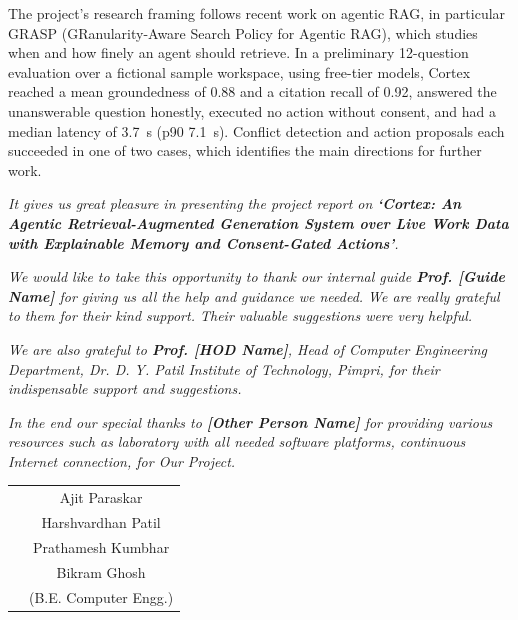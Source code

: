 \documentclass[oneside,a4paper,12pt]{report}
\newcommand{\ProjectTitle}{Cortex: An Agentic Retrieval-Augmented Generation System over Live Work Data with Explainable Memory and Consent-Gated Actions}
\begin{document}
\vspace*{0.5\baselineskip}
The project's research framing follows recent work on agentic RAG, in particular GRASP (GRanularity-Aware Search Policy for Agentic RAG), which studies when and how finely an agent should retrieve. In a preliminary 12-question evaluation over a fictional sample workspace, using free-tier models, Cortex reached a mean groundedness of 0.88 and a citation recall of 0.92, answered the unanswerable question honestly, executed no action without consent, and had a median latency of 3.7~s (p90 7.1~s). Conflict detection and action proposals each succeeded in one of two cases, which identifies the main directions for further work.


{   \setlength{\parindent}{11mm} }
{ \setlength{\parindent}{0mm} }
\textit{It gives us great pleasure in presenting the project report
on {\bfseries \fontsize{12}{12} \selectfont `\ProjectTitle'}.}
\vspace*{1.5\baselineskip}

 \textit{We would like to take this opportunity to thank our internal guide
 \textbf{Prof. [Guide Name]} for giving us all the help and guidance we needed. We are
 really grateful to them for their kind support. Their valuable suggestions were very helpful.} \vspace*{1.5\baselineskip}

 \textit{We are also grateful to \textbf{Prof. [HOD Name]}, Head of Computer
 Engineering Department, Dr. D. Y. Patil Institute of Technology, Pimpri, for their indispensable
 support and suggestions.}
\vspace*{1.5\baselineskip}

\textit{In the end our special thanks to \textbf{[Other Person Name]} for
providing various resources such as  laboratory with all needed software platforms,
continuous Internet connection, for Our Project.}
\vspace*{3\baselineskip} \\
\begin{tabular}{p{8.2cm}c}
&Ajit Paraskar\\
&Harshvardhan Patil\\
&Prathamesh Kumbhar\\
&Bikram Ghosh\\
&(B.E. Computer Engg.)
\end{tabular}
\end{document}
